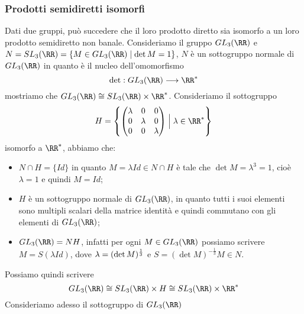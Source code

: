 \documentclass[11pt]{scrartcl}
\begin{document}
\subsubsection{Prodotti semidiretti isomorfi}

Dati due gruppi, può succedere che il loro prodotto diretto sia isomorfo a 
un loro prodotto semidiretto non banale.\newline
Consideriamo il gruppo $GL_3(\RR)$ e $N = SL_3(\RR) = \{M \in GL_3(\RR)
\mid \det M = 1\}$, $N$ è un sottogruppo normale di $GL_3(\RR)$ in quanto è il nucleo
dell'omomorfismo
\[
    \det: GL_3(\RR) \longrightarrow \RR^*
\]
mostriamo che $GL_3(\RR) \cong SL_3(\RR)\times\RR^*$. Consideriamo il sottogruppo
\[
    H = \left\{\begin{pmatrix}
    \lambda & 0 & 0\\
    0 & \lambda & 0\\
    0 & 0 & \lambda
    \end{pmatrix}\Bigm| \lambda \in \RR^* \right\}
\]isomorfo a $\RR^*$, abbiamo che:

\begin{itemize}
    \item $N \cap H = \{Id\}$ in quanto $M = \lambda Id \in N\cap H$ è tale
    che $\det M = \lambda^3 = 1$, cioè $\lambda = 1$ e quindi $M = Id$;
    \item $H$ è un sottogruppo normale di $GL_3(\RR)$, in quanto tutti i suoi elementi
    sono multipli scalari della matrice identità e quindi commutano con gli
    elementi di $GL_3(\RR)$;
    \item $GL_3(\RR) = NH$, infatti per ogni $M \in GL_3(\RR)$ possiamo scrivere $M = S(\lambda Id)$,
    dove $\lambda = \nolinebreak(\det M)^{\frac 1 3}$ e $S = (\det M)^{-\frac 1 3} M \in N$.
\end{itemize}

Possiamo quindi scrivere 
\[
    GL_3(\RR) \cong SL_3(\RR) \times H \cong SL_3(\RR)\times \RR^*
\]
Consideriamo adesso il sottogruppo di $GL_3(\RR)$
\end{document}
